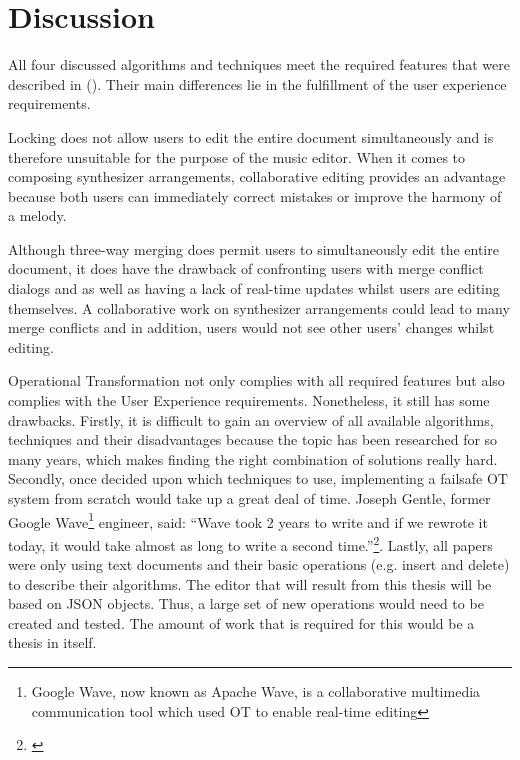 \section{Discussion}
\label{sync-discussion}

All four discussed algorithms and techniques meet the required features that were described in (). Their main differences lie in the fulfillment of the user experience requirements.

Locking does not allow users to edit the entire document simultaneously and is therefore unsuitable for the purpose of the music editor. When it comes to composing synthesizer arrangements, collaborative editing provides an advantage because both users can immediately correct mistakes or improve the harmony of a melody.

Although three-way merging does permit users to simultaneously edit the entire document, it does have the drawback of confronting users with merge conflict dialogs and as well as having a lack of real-time updates whilst users are editing themselves. A collaborative work on synthesizer arrangements could lead to many merge conflicts and in addition, users would not see other users' changes whilst editing.

Operational Transformation not only complies with all required features but also complies with the User Experience requirements. Nonetheless, it still has some drawbacks. Firstly, it is difficult to gain an overview of all available algorithms, techniques and their disadvantages because the topic has been researched for so many years, which makes finding the right combination of solutions really hard. Secondly, once decided upon which techniques to use, implementing a failsafe OT system from scratch would take up a great deal of time. Joseph Gentle, former Google Wave\footnote{Google Wave, now known as Apache Wave, is a collaborative multimedia communication tool which used OT to enable real-time editing} engineer, said: ``Wave took 2 years to write and if we rewrote it today, it would take almost as long to write a second time.''\footnote{\cite{gentle2011sharejs}}. Lastly, all papers were only using text documents and their basic operations (e.g. insert and delete) to describe their algorithms. The editor that will result from this thesis will be based on JSON objects. Thus, a large set of new operations would need to be created and tested. The amount of work that is required for this would be a thesis in itself.


